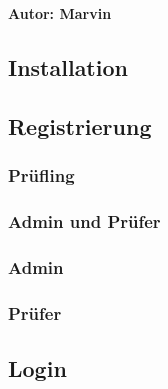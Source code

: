 \textbf{Autor: Marvin}\\

\subsection{Installation}
\subsection{Registrierung}
\subsubsection{Prüfling}
\subsubsection{Admin und Prüfer}
\subsubsection{Admin}
\subsubsection{Prüfer}
\subsection{Login}